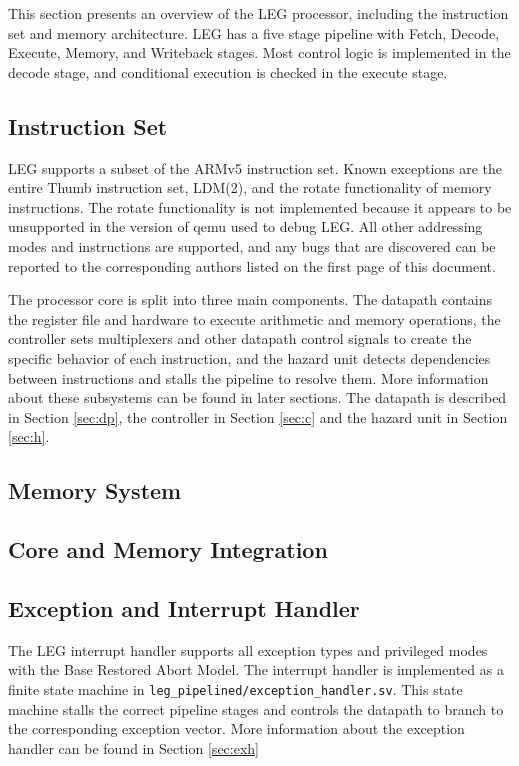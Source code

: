 This section presents an overview of the LEG processor, including the instruction set and memory architecture.
LEG has a five stage pipeline with Fetch, Decode, Execute, Memory, and Writeback stages.
Most control logic is implemented in the decode stage, and conditional execution is checked in the execute stage.

\subsection{Instruction Set}

LEG supports a subset of the ARMv5 instruction set. 
Known exceptions are the entire Thumb instruction set, LDM(2), and the rotate functionality of memory instructions.
The rotate functionality is not implemented because it appears to be unsupported in the version of qemu used to debug LEG.
All other addressing modes and instructions are supported, and any bugs that are discovered can be reported to the corresponding authors listed on the first page of this document.

The processor core is split into three main components.
The datapath contains the register file and hardware to execute arithmetic and memory operations, the controller sets multiplexers and other datapath control signals to create the specific behavior of each instruction, and the hazard unit detects dependencies between instructions and stalls the pipeline to resolve them.
More information about these subsystems can be found in later sections.
The datapath is described in Section \ref{sec:dp}, the controller in Section \ref{sec:c} and the hazard unit in Section \ref{sec:h}.


\subsection{Memory System}

\subsection{Core and Memory Integration}

\subsection{Exception and Interrupt Handler}

The LEG interrupt handler supports all exception types and privileged modes with the Base Restored Abort Model.
The interrupt handler is implemented as a finite state machine in \texttt{leg\_pipelined/exception\_handler.sv}.
This state machine stalls the correct pipeline stages and controls the datapath to branch to the corresponding exception vector.
More information about the exception handler can be found in Section \ref{sec:exh}
